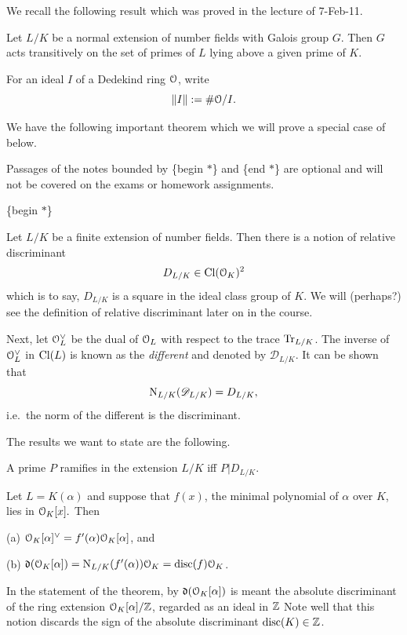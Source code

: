 \documentclass[10pt,a4paper]{amsart}
\begin{document}
We recall the following result \cite[23, p.70]{M} which was proved in the
lecture of 7-Feb-11.

\begin{thm}
Let $L/K$ be a normal extension of number fields with Galois group $G$. Then
$G$ acts transitively on the set of primes of $L$ lying above a given prime of
$K$.
\end{thm}

\begin{notation}
For an ideal $I$ of a Dedekind ring $\mathcal{O}$, write \[\| I\| := \# \mathcal{O}/I.\]
\end{notation}

We have the following important theorem which we will prove a special
case of below.

\begin{rem}
Passages of the notes bounded by \{begin $*$\} and \{end $*$\} are optional and
will not be covered on the exams or homework assignments.
\end{rem}

\noindent \{begin $*$\}

Let $L/K$ be a finite extension of number fields. Then there is a notion of
relative discriminant $$D_{L/K} \in \mathrm{Cl}(\mathcal{O}_K)^2$$ which is to say, $D_{L/K}$ is
a square in the ideal class group of $K$. We will (perhaps?) see the definition
of relative discriminant later on in the course.

Next, let $\mathcal{O}_L^\vee$ be the dual of $\mathcal{O}_L$ with respect to the trace
$\mathrm{Tr}_{L/K}$. The inverse of $\mathcal{O}_L^\vee$ in $\mathrm{Cl}(L)$ is known as the
\textit{different} and denoted by $\mathscr{D}_{L/K}$. It can be shown that
\[\mathrm{N}_{L/K}(\mathscr{D}_{L/K}) = D_{L/K},\] i.e.~the norm of the different is
the discriminant.

The results we want to state are the following.

\begin{thm}
A prime $P$ ramifies in the extension $L/K$ iff $P|D_{L/K}$.
\end{thm}

\begin{thm}
Let $L=K(\alpha)$ and suppose that $f(x)$, the minimal polynomial of $\alpha$
over $K$, lies in $\mathcal{O}_K[x].$ Then

(a) $\mathcal{O}_K[\alpha]^{\vee} = f'(\alpha)\mathcal{O}_K[\alpha]$, and

(b) $\mathfrak{d}(\mathcal{O}_K[\alpha]) = \mathrm{N}_{L/K}(f'(\alpha))\mathcal{O}_K = \mathrm{disc}(f)\mathcal{O}_K$.
\end{thm}

\begin{rem}
In the statement of the theorem, by $\mathfrak{d}(\mathcal{O}_K[\alpha])$ is meant the
absolute discriminant of the ring extension $\mathcal{O}_K[\alpha]/\mathbb{Z}$, regarded as an
ideal in $\mathbb{Z}$ Note well that this notion discards the sign of the absolute
discriminant $\mathrm{disc}(K) \in \mathbb{Z}$.
\end{rem}
\end{document}
